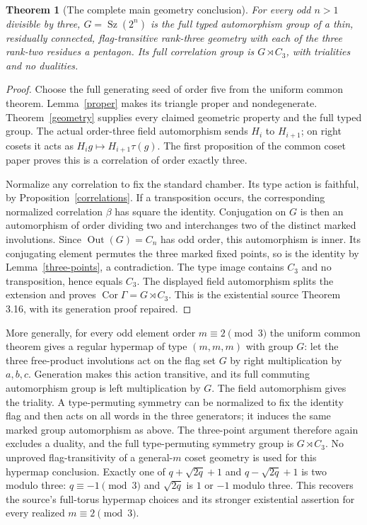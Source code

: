 \documentclass[11pt,a4paper]{article}
\newtheorem{theorem}{Theorem}\newtheorem{lemma}[theorem]{Lemma}
\newcommand{\Sz}{\operatorname{Sz}}\newcommand{\Aut}{\operatorname{Aut}}
\newcommand{\Cor}{\operatorname{Cor}}\newcommand{\gen}[1]{\langle#1\rangle}
\begin{document}
\begin{theorem}[The complete main geometry conclusion]\label{main}
For every odd $n>1$ divisible by three, $G=\Sz(2^n)$ is the full typed
automorphism group of a thin, residually connected, flag-transitive rank-three
geometry with each of the three rank-two residues a pentagon. Its full
correlation group is $G\rtimes C_3$, with trialities and no dualities.
\end{theorem}
\begin{proof}
Choose the full generating seed of order five from the uniform common
theorem. Lemma~\ref{proper} makes its triangle proper and nondegenerate.
Theorem~\ref{geometry} supplies every claimed geometric property and
the full typed group. The actual order-three field automorphism sends
$H_i$ to $H_{i+1}$; on right cosets it acts as
$H_i g\mapsto H_{i+1}\tau(g)$. The first proposition of the common
coset paper proves this is a correlation of order exactly three.

Normalize any correlation to fix the standard chamber. Its type action
is faithful, by Proposition~\ref{correlations}. If a transposition occurs,
the corresponding normalized correlation $\beta$ has square the identity.
Conjugation on $G$ is then an automorphism of order dividing two and
interchanges two of the distinct marked involutions. Since
$\operatorname{Out}(G)=C_n$ has odd order, this automorphism is inner.
Its conjugating element permutes the three marked fixed points, so is
the identity by Lemma~\ref{three-points}, a contradiction. The type image
contains $C_3$ and no transposition, hence equals $C_3$. The displayed
field automorphism splits the extension and proves $\Cor\Gamma=G\rtimes C_3$.
This is the existential source Theorem 3.16, with its generation proof repaired.
\end{proof}

More generally, for every odd element order $m\equiv2\pmod3$ the uniform
common theorem gives a regular hypermap of type $(m,m,m)$ with group $G$:
let the three free-product involutions act on the flag set $G$ by right
multiplication by $a,b,c$. Generation makes this action transitive, and
its full commuting automorphism group is left multiplication by $G$.
The field automorphism gives the triality. A type-permuting symmetry can
be normalized to fix the identity flag and then acts on all words in the
three generators; it induces the same marked group automorphism as above.
The three-point argument therefore again excludes a duality, and the full
type-permuting symmetry group is $G\rtimes C_3$. No unproved flag-transitivity
of a general-$m$ coset geometry is used for this hypermap conclusion.
Exactly one of $q+\sqrt{2q}+1$ and $q-\sqrt{2q}+1$ is two modulo three:
$q\equiv-1\pmod3$ and $\sqrt{2q}$ is $1$ or $-1$ modulo three.
This recovers the source's full-torus hypermap choices and its stronger
existential assertion for every realized $m\equiv2\pmod3$.
\end{document}
